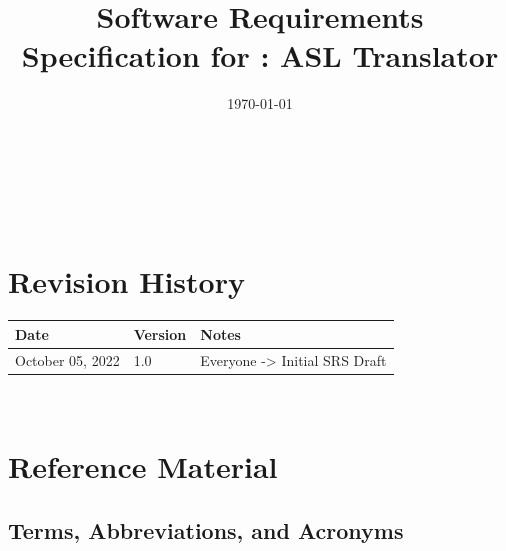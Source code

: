 \documentclass[12pt]{article}
\begin{document}
\title{Software Requirements Specification for \progname: ASL Translator} 
\author{\authname}
\date{\today}

\maketitle

~\newpage


\tableofcontents

~\newpage

\section*{Revision History}

\begin{tabularx}{\textwidth}{p{4cm}p{2cm}X}
\toprule {\bf Date  } & {\bf Version} & {\bf Notes}\\
\midrule
October 05, 2022 & 1.0 & Everyone -> Initial SRS Draft\\

\bottomrule
\end{tabularx}

~\newpage

\section{Reference Material}

\subsection{Terms, Abbreviations, and Acronyms}
\end{document}
